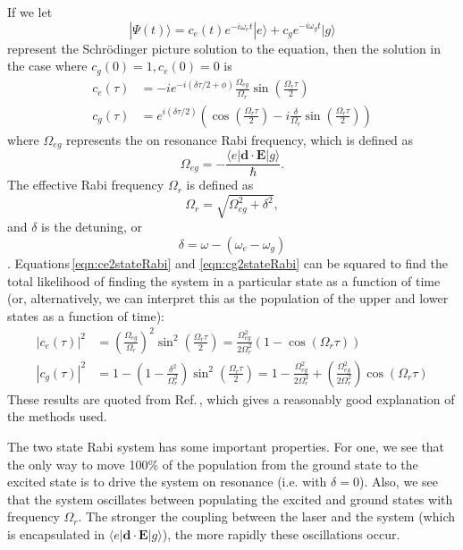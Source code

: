 If we let 
\begin{equation}
|\Psi(t)\rangle = c_e(t)e^{-i\omega_e t}|e\rangle + c_g e^{-i\omega_g t}|g\rangle
\end{equation}
represent the Schr\"odinger picture solution to the equation, then the solution in the case where $c_g(0)=1,c_e(0)=0$ is 
\begin{align}
c_e(\tau)&=-i e^{-i(\delta \tau/2+\phi)} \frac{\Omega_{eg}}{\Omega_{r}} \sin\left(\frac{\Omega_r \tau}{2}\right)\label{eqn:ce2stateRabi}\\
c_g(\tau)&=e^{i(\delta \tau/2)} \left(
\cos\left(\frac{\Omega_r \tau}{2}\right)
- i\frac{\delta}{\Omega_r} \sin\left(\frac{\Omega_r \tau}{2}\right)\right)
\label{eqn:cg2stateRabi}
\end{align}
where $\Omega_{eg}$ represents the on resonance Rabi frequency, which is defined as 
\begin{equation}
\Omega_{eg}=-\frac{\langle e |\mathbf{d}\cdot\mathbf{E}|g \rangle }{\hbar}.
\end{equation}
The effective Rabi frequency $\Omega_r$ is defined as 
\begin{equation}
\Omega_r=\sqrt{\Omega_{eg}^2+\delta^2},
\end{equation}
and $\delta$ is the detuning, or 
\begin{equation}
\delta=\omega-(\omega_e-\omega_g)
\end{equation}.
Equations\,\ref{eqn:ce2stateRabi} and \ref{eqn:cg2stateRabi} can be squared to find the total likelihood of finding the system in a particular state as a function of time (or, alternatively, we can interpret this as the population of the upper and lower states as a function of time):
\begin{align}
|c_e(\tau)|^2&=\left(\frac{\Omega_{eg}}{\Omega_r}\right)^2 \sin^2\left(\frac{\Omega_r\tau}{2}\right)
=\frac{\Omega_{eg}^2}{2\Omega_r^2}(1-\cos(\Omega_r\tau))\\
|c_g(\tau)|^2&=1-\left(1-\frac{\delta^2}{\Omega_r^2}\right)\sin^2
\left(\frac{\Omega_r \tau}{2}\right)
=1-\frac{\Omega_{eg}^2}{2\Omega_r^2} + \left(\frac{\Omega_{eg}^2}{2\Omega_r^2}\right)\cos(\Omega_r \tau)
\end{align}
These results are quoted from Ref.\,\cite{Young1997363}, which gives a reasonably good explanation of the methods used.

The two state Rabi system has some important properties. For one, we see that the only way to move 100\% of the population from the ground state to the excited state is to drive the system on resonance (i.e. with $\delta=0$). Also, we see that the system oscillates between populating the excited and ground states with frequency $\Omega_{r}$. The stronger the coupling between the laser and the system (which is encapsulated in $\langle e|\mathbf{d}\cdot\mathbf{E}|g\rangle$), the more rapidly these oscillations occur. 

